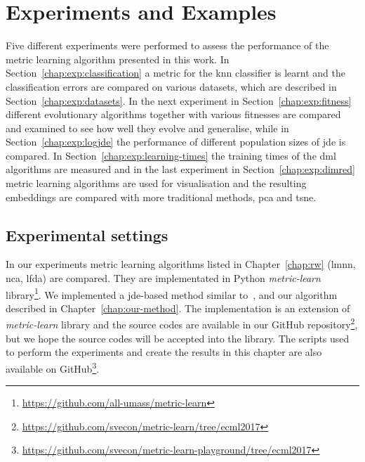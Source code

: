 \documentclass[12pt,a4paper]{report}
\begin{document}


\chapter{Experiments and Examples} \label{chap:exp}
Five different experiments were performed to assess the performance of the metric learning algorithm presented in this work. In Section~\ref{chap:exp:classification} a metric for the \ac{knn} classifier is learnt and the classification errors are compared on various datasets, which are described in Section~\ref{chap:exp:datasets}. In the next experiment in Section~\ref{chap:exp:fitness} different evolutionary algorithms together with various fitnesses  are compared and examined to see how well they evolve and generalise, while in Section~\ref{chap:exp:logjde} the performance of different population sizes of \ac{jde} is compared. In Section~\ref{chap:exp:learning-times} the training times of the \ac{dml} algorithms are measured and in the last experiment in Section~\ref{chap:exp:dimred} metric learning algorithms are used for visualisation and the resulting embeddings are compared with more traditional methods, \ac{pca} and \ac{tsne}.

\section{Experimental settings} 
In our experiments metric learning algorithms listed in Chapter~\ref{chap:rw} (\ac{lmnn}, \ac{nca}, \ac{lfda}) are compared. They are implementated in Python \textit{metric-learn} library\footnote{\url{https://github.com/all-umass/metric-learn}}. We implemented a \ac{jde}-based method similar to~\citep{fukui2013evolutionary}, and our algorithm described in Chapter~\ref{chap:our-method}. The implementation is an extension of \textit{metric-learn} library and the source codes are available in our GitHub repository\footnote{\url{https://github.com/svecon/metric-learn/tree/ecml2017}}, but we hope the source codes will be accepted into the library. The scripts used to perform the experiments and create the results in this chapter are also available on GitHub\footnote{\url{https://github.com/svecon/metric-learn-playground/tree/ecml2017}}.
\end{document}
